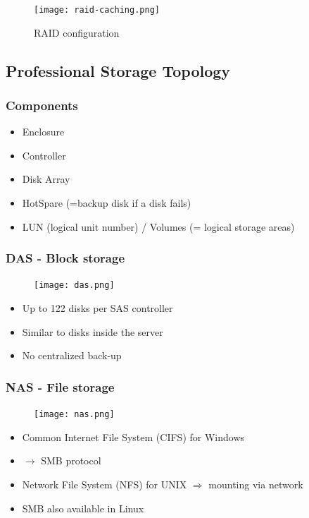 \documentclass{article}
\begin{document}
\begin{figure}[H]
    \centering
    \texttt{[image: raid-caching.png]}
    \caption{RAID configuration}
\end{figure}


\subsection{Professional Storage Topology}

\subsubsection{Components}

\begin{itemize}
    \item Enclosure
    \item Controller
    \item Disk Array
    \item HotSpare (=backup disk if a disk fails)
    \item LUN (logical unit number) / Volumes (= logical storage areas)
\end{itemize}

\subsubsection{DAS - Block storage}

\begin{figure}[H]
    \centering
    \texttt{[image: das.png]}
    \caption{}
\end{figure}

\begin{itemize}
    \item Up to 122 disks per SAS controller
    \item Similar to disks inside the server
    \item No centralized back-up
\end{itemize}


\subsubsection{NAS - File storage}

\begin{figure}[H]
    \centering
    \texttt{[image: nas.png]}
    \caption{}
\end{figure}

\begin{itemize}
    \item Common Internet File System (CIFS) for Windows
    \item $\rightarrow$ SMB protocol
    \item Network File System (NFS) for UNIX $\Rightarrow$ mounting via network
    \item SMB also available in Linux
\end{itemize}
\end{document}
